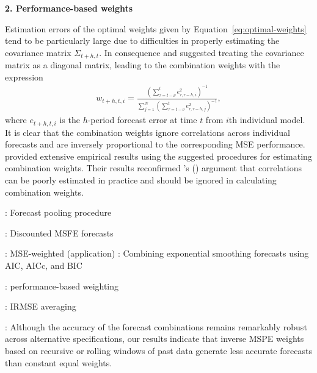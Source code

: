 \documentclass[11pt]{article}
\def\citeapos#1{\citeauthor{#1}'s (\citeyear{#1})}
\begin{document}

{\bf{2. Performance-based weights}}

Estimation errors of the optimal weights given by Equation~\eqref{eq:optimal-weights} tend to be particularly large due to difficulties in properly estimating the covariance matrix $\Sigma_{t+h, t}$. In consequence \cite{Bates1969-yj} and \cite{Newbold1974-lp} suggested treating the covariance matrix as a diagonal matrix, leading to the combination weights with the expression
\begin{align}
w_{t+h, t, i}=\frac{\left( \sum_{\tau=t-\nu}^{t} e_{\tau, \tau-h, i}^{2} \right)^{-1}}{\sum_{j=1}^{N}\left(\sum_{\tau=t-\nu}^{t} e_{\tau, \tau-h, j}^{2}\right)^{-1}},
\end{align}
where $e_{t+h, t, i}$ is the $h$-period forecast error at time $t$ from $i$th individual model. It is clear that the combination weights ignore correlations across individual forecasts and are inversely proportional to the corresponding MSE performance. \cite{Winkler1983-ra} provided extensive empirical results using the suggested procedures for estimating combination weights. Their results reconfirmed \citeapos{Newbold1974-lp} argument that correlations can be poorly estimated in practice and should be ignored in calculating combination weights.


\cite{Stock1998-np}: Forecast pooling procedure

\cite{Stock2004-rq}: Discounted MSFE forecasts

\cite{Clark2010-jx}: MSE-weighted (application)
\cite{Kolassa2011-ai}: Combining exponential smoothing forecasts using AIC, AICc, and BIC

\cite{Genre2013-ut}: performance-based weighting

\cite{Nowotarski2014-ev}: IRMSE averaging 

\cite{Baumeister2015-ft}: Although the accuracy of the forecast combinations remains remarkably robust across alternative specifications, our results indicate that inverse MSPE weights based on recursive or rolling windows of past data generate less accurate forecasts than constant equal weights.
\end{document}
